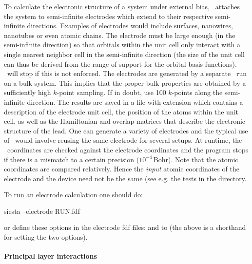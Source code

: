 To calculate the electronic structure of a system under external bias,
\tsiesta\ attaches the system to semi-infinite electrodes which extend
to their respective semi-infinite directions. Examples of electrodes
would include surfaces, nanowires, nanotubes or even atomic
chains. The electrode must be large enough (in the semi-infinite
direction) so that orbitals within the unit cell only interact with a
single nearest neighbor cell in the semi-infinite direction (the size
of the unit cell can thus be derived from the range of support for the
orbital basis functions). \tsiesta\ will stop if this is not
enforced. The electrodes are generated by a separate \tsiesta\ run on
a bulk system. This implies that the proper bulk properties are
obtained by a sufficiently high $k$-point sampling. If in doubt, use
100 $k$-points along the semi-infinite direction. The results are
saved in a file with extension  which contains a
description of the electrode unit cell, the position of the atoms
within the unit cell, as well as the Hamiltonian and overlap matrices
that describe the electronic structure of the lead. One can generate a
variety of electrodes and the typical use of \tsiesta\ would involve
reusing the same electrode for several setups. At runtime, the
\tsiesta\ coordinates are checked against the electrode coordinates
and the program stops if there is a mismatch to a certain precision
($10^{-4}\,\mathrm{Bohr}$). Note that the atomic coordinates are
compared relatively. Hence the \emph{input} atomic coordinates of the
electrode and the device need not be the same (see e.g. the tests in
the  directory.

To run an electrode calculation one should do:
\begin{shellexample}
  siesta --electrode RUN.fdf
\end{shellexample}
or define these options in the electrode fdf files:
 and  to  (the above
 is a shorthand for setting the two options).

\paragraph{Principal layer interactions} %
%

